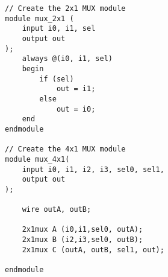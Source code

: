 \documentclass[]{report}
\begin{document}
\begin{lstlisting}[caption={Module Instantition Example (4x1 MUX)}]
// Create the 2x1 MUX module
module mux_2x1 (
	input i0, i1, sel
	output out
);
	always @(i0, i1, sel)
	begin
		if (sel)
			out = i1;
		else
			out = i0;
	end
endmodule

// Create the 4x1 MUX module
module mux_4x1(
	input i0, i1, i2, i3, sel0, sel1,
	output out
);

	wire outA, outB;
	
	2x1mux A (i0,i1,sel0, outA);
	2x1mux B (i2,i3,sel0, outB);
	2x1mux C (outA, outB, sel1, out);
	
endmodule
\end{lstlisting}
\end{document}

